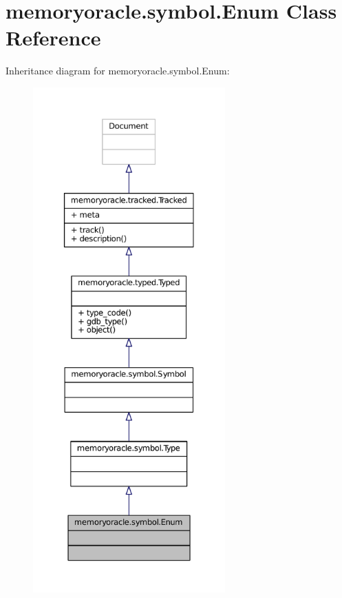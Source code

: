 \hypertarget{classmemoryoracle_1_1symbol_1_1Enum}{}\section{memoryoracle.\+symbol.\+Enum Class Reference}
\label{classmemoryoracle_1_1symbol_1_1Enum}


Inheritance diagram for memoryoracle.\+symbol.\+Enum\+:
\nopagebreak
\begin{figure}[H]
\begin{center}
\leavevmode
\includegraphics[height=550pt]{classmemoryoracle_1_1symbol_1_1Enum__inherit__graph}
\end{center}
\end{figure}


